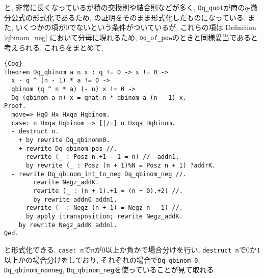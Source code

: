 \documentclass[11pt]{jarticle}
\theoremstyle{mystyle}
\newcommand{\0}{\textbf{0}}
\newcommand{\1}{\textbf{1}}
\newcommand{\2}{\textbf{2}}
\begin{document}
と, 非常に長くなっているが積の交換則や結合則などが多く, {\tt Dq\_quot}が商の$q$-微分公式の形式化であるため, \cite{Kac}の証明をそのまま形式化したものになっている.  また, いくつかの項が$0$でないという条件がついているが, これらの項は Definition \ref{qbinom_neg} において分母に現れるため, {\tt Dq\_of\_pow}のときと同様妥当であると考えられる. これらをまとめて, 
\begin{lstlisting}{Coq}
Theorem Dq_qbinom a n x : q != 0 -> x != 0 ->
  x - q ^ (n - 1) * a != 0 ->
  qbinom (q ^ n * a) (- n) x != 0 ->
  Dq (qbinom a n) x = qnat n * qbinom a (n - 1) x.
Proof.
  move=> Hq0 Hx Hxqa Hqbinom.
  case: n Hxqa Hqbinom => [|/=] n Hxqa Hqbinom.
  - destruct n.
    + by rewrite Dq_qbinomn0.
    + rewrite Dq_qbinom_pos //.
      rewrite (_ : Posz n.+1 - 1 = n) // -addn1.
      by rewrite (_ : Posz (n + 1)%N = Posz n + 1) ?addrK.
  - rewrite Dq_qbinom_int_to_neg Dq_qbinom_neg //.
        rewrite Negz_addK.
        rewrite (_ : (n + 1).+1 = (n + 0).+2) //.
        by rewrite addn0 addn1.
      rewrite (_ : Negz (n + 1) = Negz n - 1) //.
      by apply itransposition; rewrite Negz_addK.
    by rewrite Negz_addK addn1.
Qed.
\end{lstlisting}
と形式化できる. {\tt case:\,n}で{\tt n}が$0$以上か負かで場合分けを行い, {\tt destruct n}で$0$か$1$以上かの場合分けをしており, それぞれの場合で{\tt Dq\_qbinom\_0}, {\tt Dq\_qbinom\_nonneg}, {\tt Dq\_qbinom\_neg}を使っていることが見て取れる. 
\end{document}
